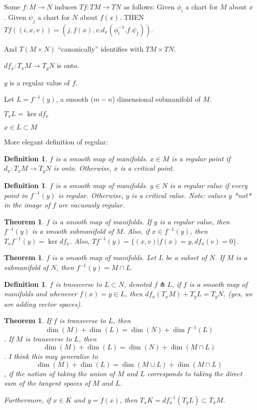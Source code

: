 \documentclass[11pt,leqno,oneside]{amsart}
\newenvironment{dateenv}{
	\vspace{1em}
}{
	\vspace{1em}
}
\newcommand{\transverse}{\pitchfork}
\newcommand{\de}{\emph}
\newcommand{\mydate}[4]{
	\newdate{#1}{#2}{#3}{#4}
	\begin{dateenv}
		\hfill\displaydate{#1}
	\end{dateenv}
}
\theoremstyle{mystyle} \newtheorem{thrm}[thm]{Theorem}
\theoremstyle{mystyle} \newtheorem{defi}[thm]{Definition}
\begin{document}
Some $f: M \to N$ induces $Tf : TM \to TN$ as follows:
Given $\phi_i$ a chart for $M$ about $x$.
Given $\psi_j$ a chart for $N$ about $f(x)$.
THEN
$Tf((i, x, v)) = (j, f(x), v.d_x(\phi_i^{-1}.f.\psi_j))$.

And $T(M \times N)$ ``canonically'' identifies with $TM \times TN$.


\mydate{d2}{26}{9}{2016}



$df_x : T_xM \to T_yN$ is onto.

$y$ is a regular value of $f$.

Let $L = f^{-1}(y)$, a smooth ($m-n$) dimensional submanifold of $M$.

$T_xL = \ker df_x$

$x \in L \subset M$

\mydate{d3}{28}{9}{2016}

More elegant definition of regular:
\begin{defi}
	$f$ is a smooth map of manifolds.
	$x \in M$ is a \de{regular} point if $d_x : T_xM \to T_yN$ is onto.  Otherwise, $x$ is a \de{critical} point.
\end{defi}

\begin{defi}
	$f$ is a smooth map of manifolds.
	$y \in N$ is a \de{regular} value if every point in $f^{-1}(y)$ is regular.  Otherwise, $y$ is a \de{critical} value.  Note: values $y$ *not* in the image of $f$ are vacuously regular.
\end{defi}

\begin{thrm}
	$f$ is a smooth map of manifolds.
	If $y$ is a regular value, then $f^{-1}(y)$ is a smooth submanifold of $M$.
	Also, if $x \in f^{-1}(y)$, then $T_xf^{-1}(y) = \ker df_x$.
	Also, $Tf^{-1}(y) = \{ (x,v) | f(x)=y, df_x(v) = 0\}$.
\end{thrm}

\begin{thrm}
	$f$ is a smooth map of manifolds.
	Let $L$ be a subset of $N$.
	If $M$ is a submanifold of $N$, then $f^{-1}(y) = M \cap L$.
\end{thrm}

\begin{defi}
	$f$ is \de{transverse} to $L \subset N$, denoted $f \transverse L$, if $f$ is a smooth map of manifolds and whenever $f(x) = y \in L$, then $df_x(T_xM) + T_yL = T_yN$.  (yes, we are adding vector spaces).
\end{defi}

\begin{thrm}
	If $f$ is transverse to $L$, then $$\dim(M) + \dim(L) = \dim(N) + \dim f^{-1}(L)$$.
	If $M$ is transverse to $L$, then $$\dim(M) + \dim(L) = \dim(N) + \dim(M \cap L)$$.
	I think this may generalize to $$\dim(M) + \dim(L) = \dim(M \cup L) + \dim(M \cap L)$$, if the notion of taking the union of $M$ and $L$ corresponds to taking the direct sum of the tangent spaces of $M$ and $L$.

	Furthermore, if $x \in K$ and $y = f(x)$, then $T_x K = df^{-1}_x(T_y L) \subset T_x M$.
\end{thrm}
\end{document}
